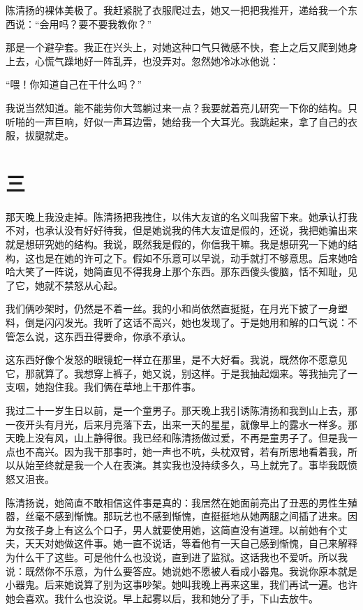  陈清扬的裸体美极了。我赶紧脱了衣服爬过去，她又一把把我推开，递给我一个东西说：“会用吗？要不要我教你？” 
 
 那是一个避孕套。我正在兴头上，对她这种口气只微感不快，套上之后又爬到她身上去，心慌气躁地好一阵乱弄，也没弄对。忽然她冷冰冰他说： 
 
 “喂！你知道自己在干什么吗？” 
 
 我说当然知道。能不能劳你大驾躺过来一点？我要就着亮儿研究一下你的结构。只听啪的一声巨响，好似一声耳边雷，她给我一个大耳光。我跳起来，拿了自己的衣服，拔腿就走。 
 
 

\section{三} 
 
那天晚上我没走掉。陈清扬把我拽住，以伟大友谊的名义叫我留下来。她承认打我不对，也承认没有好好待我，但是她说我的伟大友谊是假的，还说，我把她骗出来就是想研究她的结构。我说，既然我是假的，你信我干嘛。我是想研究一下她的结构，这也是在她的许可之下。假如不乐意可以早说，动手就打不够意思。后来她哈哈大笑了一阵说，她简直见不得我身上那个东西。那东西傻头傻脑，恬不知耻，见了它，她就不禁怒从心起。 
 
 我们俩吵架时，仍然是不着一丝。我的小和尚依然直挺挺，在月光下披了一身塑料，倒是闪闪发光。我听了这话不高兴，她也发现了。于是她用和解的口气说：不管怎么说，这东西丑得要命，你承不承认。 
 
 这东西好像个发怒的眼镜蛇一样立在那里，是不大好看。我说，既然你不愿意见它，那就算了。我想穿上裤子，她又说，别这样。于是我抽起烟来。等我抽完了一支咽，她抱住我。我们俩在草地上干那件事。 
 
 我过二十一岁生日以前，是一个童男子。那天晚上我引诱陈清扬和我到山上去，那一夜开头有月光，后来月亮落下去，出来一天的星星，就像早上的露水一样多。那天晚上没有风，山上静得很。我已经和陈清扬做过爱，不再是童男子了。但是我一点也不高兴。因为我干那事时，她一声也不吭，头枕双臂，若有所思地看着我，所以从始至终就是我一个人在表演。其实我也没持续多久，马上就完了。事毕我既愤怒又沮丧。 
 
 陈清扬说，她简直不敢相信这件事是真的：我居然在她面前亮出了丑恶的男性生殖器，丝毫不感到惭愧。那玩艺也不感到惭愧，直挺挺地从她两腿之间插了进来。因为女孩子身上有这么个口子，男人就要使用她，这简直没有道理。以前她有个丈夫，天天对她做这件事。她一直不说话，等着他有一天自己感到惭愧，自己来解释为什么干了这些。可是他什么也没说，直到进了监狱。这话我也不爱听。所以我说：既然你不乐意，为什么要答应。她说她不愿被人看成小器鬼。我说你原本就是小器鬼。后来她说算了别为这事吵架。她叫我晚上再来这里，我们再试一遍。也许她会喜欢。我什么也没说。早上起雾以后，我和她分了手，下山去放牛。 
 
